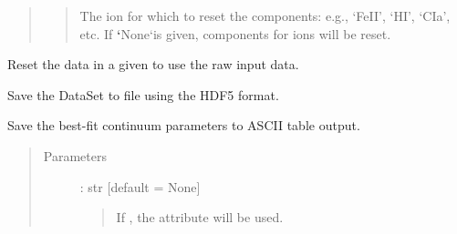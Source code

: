 \documentclass[letterpaper,10pt,english]{sphinxmanual}
\begin{document}
\begin{fulllineitems}
\begin{fulllineitems}
\begin{quote}
\begin{description}
\begin{quote}
The ion for which to reset the components: e.g., ‘FeII’, ‘HI’, ‘CIa’, etc.
If {\color{red}\bfseries{}{}`}None{}`is given,  components for  ions will be reset.
\end{quote}

\end{description}\end{quote}

\end{fulllineitems}


\begin{fulllineitems}
\label{\detokenize{api:VoigtFit.DataSet.reset_region}}
Reset the data in a given {\hyperref[\detokenize{api:regions.Region}]{}} to use the raw input data.

\end{fulllineitems}


\begin{fulllineitems}
\label{\detokenize{api:VoigtFit.DataSet.save}}
Save the DataSet to file using the HDF5 format.

\end{fulllineitems}


\begin{fulllineitems}
\label{\detokenize{api:VoigtFit.DataSet.save_cont_parameters_to_file}}
Save the best-fit continuum parameters to ASCII table output.
\begin{quote}\begin{description}
\item[{Parameters}] \leavevmode
{} : str   {[}default = None{]}
\begin{quote}

If , the  attribute will be used.
\end{quote}


\end{description}
\end{quote}
\end{fulllineitems}
\end{fulllineitems}
\end{document}
